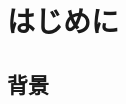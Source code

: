 \documentclass[a4paper,11pt,uplatex]{ujreport}
\begin{document}
\setcounter{page}{0}

\tableofcontents

\clearpage


\chapter{はじめに}
\label{chap:Introduction}


\section{背景}
\label{sec:背景}

\end{document}
